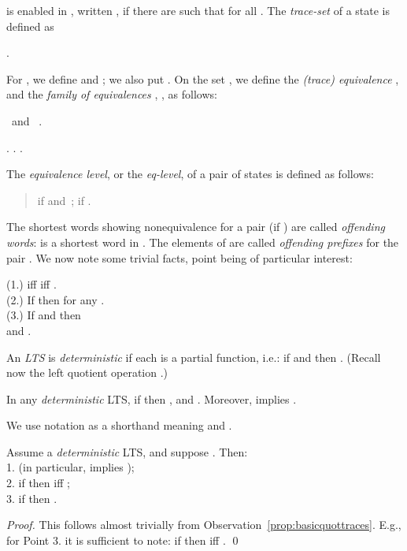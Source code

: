 \documentclass[12pt]{article}
\begin{document}
is enabled in , written , if there are
 such that  
for all .
The \emph{trace-set} of a state  is defined as
\begin{center}
. 
\end{center}
For , 
we define
 and ;
we also put
.
On the set , we define the \emph{(trace) equivalence} , and the \emph{family  
of equivalences} , , as follows:
\begin{center}
   
\ and 
\   .
\end{center}

\begin{observ}\label{prop:basicstratif}
.
.
.


\end{observ}
The \emph{equivalence level}, or the \emph{eq-level},
of a pair of states is defined as follows:
\begin{quote}
 if  and \,;
 if .
\end{quote}
The shortest words 
showing nonequivalence for a pair  (if )
are called \emph{offending words}:
 is a shortest word in 
. 
The elements of  are called \emph{offending
prefixes} for the pair .
We now note some trivial facts, point  being of particular 
interest:

\begin{observ}\label{prop:basicoffwords}
(1.)  iff  iff .
\\
(2.) If  then  for any
.
\\
(3.) If  and  then 
\\
\hspace*{3em} and . 
\end{observ}
An \emph{LTS}   is 
\emph{deterministic} 
if each  is a partial
function, i.e.:
if  and  then
. (Recall now the left quotient operation .)

\begin{observ}\label{prop:basicquottraces}
In any \emph{deterministic} LTS,
if  then 
, and
.
Moreover,  implies  
.
\end{observ}
We use notation  as a shorthand meaning
 and . 

\begin{prop}\label{prop:basiceqleveldrop}
Assume a \emph{deterministic} LTS, and suppose
. Then:
\\
1.  
(in particular,  implies
);
\\
2. if  then 
 iff 
; 
\\
3. if  then 
.
\end{prop}

\begin{proof}
This follows almost trivially from 
Observation~\ref{prop:basicquottraces}. 
E.g., for Point 3. it is sufficient to note:
if  then 
 iff
.  
\qed
\end{proof}
\end{document}
